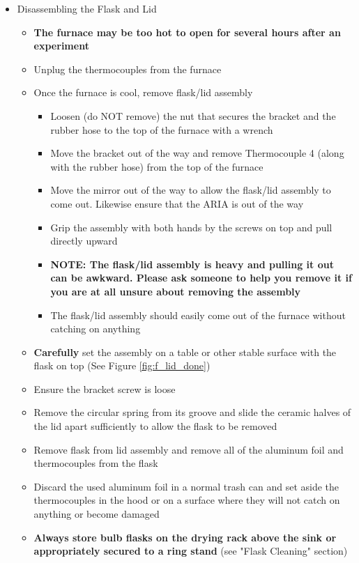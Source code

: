 \documentclass[letterpaper,11pt]{article}
\begin{document}
\begin{itemize}
    \item Disassembling the Flask and Lid
        \begin{itemize}
        \item \textbf{The furnace may be too hot to open for several hours after
             an experiment}
        \item Unplug the thermocouples from the furnace
        \item Once the furnace is cool, remove flask/lid assembly
            \begin{itemize}
            \item Loosen (do NOT remove) the nut that secures the bracket and 
                the rubber hose to the top of the furnace with a wrench
            \item Move the bracket out of the way and remove Thermocouple 4 
                (along with the rubber hose) from the top of the furnace
            \item Move the mirror out of the way to allow the flask/lid assembly
                to come out. Likewise ensure that the ARIA is out of the way
            \item Grip the assembly with both hands by the screws on top and 
                pull directly upward
            \item \textbf{NOTE: The flask/lid assembly is heavy and pulling it  
                out can be awkward. Please ask someone to help you remove it 
                if you are at all unsure about removing the assembly}
            \item The flask/lid assembly should easily come out of the furnace 
                without catching on anything
            \end{itemize}
        
        \item \textbf{Carefully} set the assembly on a table or other stable 
            surface with the flask on top (See Figure \ref{fig:f_lid_done})
        \item Ensure the bracket screw is loose
        \item Remove the circular spring from its groove and slide the ceramic
            halves of the lid apart sufficiently to allow the flask to be 
            removed
        \item Remove flask from lid assembly and  remove all of the aluminum 
            foil and thermocouples from the flask
        \item Discard the used aluminum foil in a normal trash can and set 
            aside the thermocouples in the hood or on a surface where they will
            not catch on anything or become damaged
        \item \textbf{Always store bulb flasks on the drying rack above the sink 
            or appropriately secured to a ring stand} (see "Flask Cleaning"
             section)
        \end{itemize}


\end{itemize}
\end{document}
